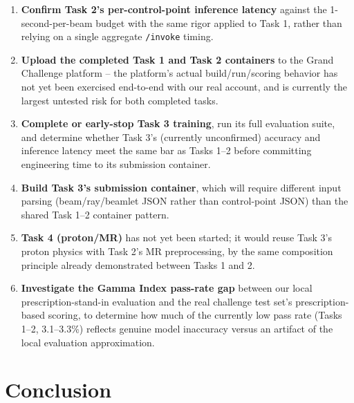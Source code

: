 \documentclass[10pt,conference]{IEEEtran}
\begin{document}
\begin{enumerate}
    \item \textbf{Confirm Task 2's per-control-point inference latency}
        against the 1-second-per-beam budget with the same rigor applied
        to Task 1, rather than relying on a single aggregate
        \texttt{/invoke} timing.
    \item \textbf{Upload the completed Task 1 and Task 2 containers} to
        the Grand Challenge platform -- the platform's actual
        build/run/scoring behavior has not yet been exercised end-to-end
        with our real account, and is currently the largest untested
        risk for both completed tasks.
    \item \textbf{Complete or early-stop Task 3 training}, run its full
        evaluation suite, and determine whether Task 3's
        (currently unconfirmed) accuracy and inference latency meet the
        same bar as Tasks 1--2 before committing engineering time to its
        submission container.
    \item \textbf{Build Task 3's submission container}, which will
        require different input parsing (beam/ray/beamlet JSON rather
        than control-point JSON) than the shared Task 1--2 container
        pattern.
    \item \textbf{Task 4 (proton/MR)} has not yet been started; it would
        reuse Task 3's proton physics with Task 2's MR preprocessing, by
        the same composition principle already demonstrated between
        Tasks 1 and 2.
    \item \textbf{Investigate the Gamma Index pass-rate gap} between our
        local prescription-stand-in evaluation and the real challenge
        test set's prescription-based scoring, to determine how much of
        the currently low pass rate (Tasks 1--2, 3.1--3.3\%) reflects
        genuine model inaccuracy versus an artifact of the local
        evaluation approximation.
\end{enumerate}

\section{Conclusion}
\end{document}
